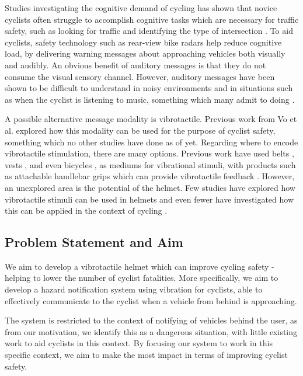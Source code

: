 \documentclass{interim}
\begin{document}
Studies investigating the cognitive demand of cycling has shown that novice cyclists often struggle to accomplish cognitive tasks which are necessary for traffic safety, such as looking for traffic and identifying the type of intersection \cite{https://doi.org/10.1002/acp.2350050205}. To aid cyclists, safety technology such as rear-view bike radars \cite{garminradar} help reduce cognitive load, by delivering warning messages about approaching vehicles both visually and audibly. An obvious benefit of auditory messages is that they do not consume the visual sensory channel. However, auditory messages have been shown to be difficult to understand in noisy environments \cite{noisyenv} and in situations such as when the cyclist is listening to music, something which many admit to doing \cite{DEWAARD2011626}.

A possible alternative message modality is vibrotactile. Previous work from Vo et al. \cite{10.1145/3411763.3451580} explored how this modality can be used for the purpose of cyclist safety, something which no other studies have done as of yet. Regarding where to encode vibrotactile stimulation, there are many options. Previous work have used belts \cite{10.1145/1613858.1613911, 10.1145/2449396.2449450, 10.1145/1060581.1060585}, vests \cite{729547, 998954, van2000tactile, 10.1145/2556288.2557404}, and even bicycles \cite{10.1145/2371574.2371631, 10.1145/3290605.3300850}, as mediums for vibrational stimuli, with products such as attachable handlebar grips which can provide vibrotactile feedback \cite{smartgrips}. However, an unexplored area is the potential of the helmet. Few studies have explored how vibrotactile stimuli can be used in helmets \cite{10.1007/978-3-642-39802-5_3, yamauchi2020vibro} and even fewer have investigated how this can be applied in the context of cycling \cite{krauss2021head}.
 

\subsection{Problem Statement and Aim}
We aim to develop a vibrotactile helmet which can improve cycling safety - helping to lower the number of cyclist fatalities. More specifically, we aim to develop a hazard notification system using vibration for cyclists, able to effectively communicate to the cyclist when a vehicle from behind is approaching. 

The system is restricted to the context of notifying of vehicles behind the user, as from our motivation, we identify this as a dangerous situation, with little existing work to aid cyclists in this context. By focusing our system to work in this specific context, we aim to make the most impact in terms of improving cyclist safety.
\end{document}
